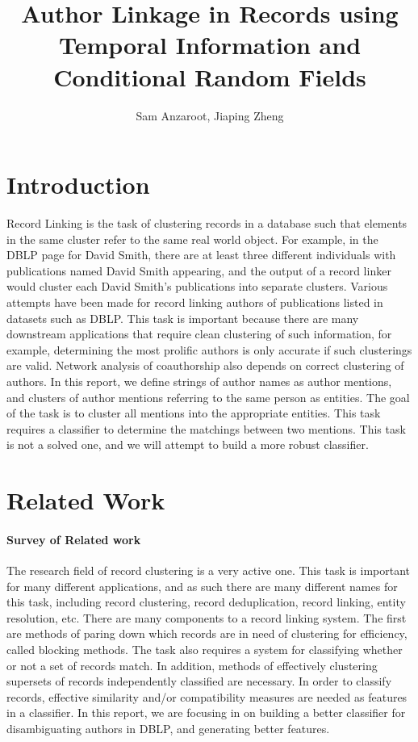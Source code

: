 \documentclass[twocolumn,letterpaper]{article}
\title{Author Linkage in Records using Temporal Information and Conditional Random Fields}
\author{Sam Anzaroot, Jiaping Zheng}
\date{}
\begin{document}
\ifpdf
{}
\else
{}
\fi

\maketitle

\section{Introduction} %
\label{sec:introduction}
Record Linking is the task of clustering records in a database such that elements in the same cluster refer to the same real world object. For example, in the DBLP page for David Smith, there are at least three different individuals with publications named David Smith appearing, and the output of a record linker would cluster each David Smith's publications into separate clusters. Various attempts have been made for record linking authors of publications listed in datasets such as DBLP. This task is important because there are many downstream applications that require clean clustering of such information, for example, determining the most prolific authors is only accurate if such clusterings are valid. Network analysis of coauthorship also depends on correct clustering of authors. In this report, we define strings of author names as author mentions, and clusters of author mentions referring to the same person as entities. The goal of the task is to cluster all mentions into the appropriate entities. This task requires a classifier to determine the matchings between two mentions. This task is not a solved one, and we will attempt to build a more robust classifier.

\section{Related Work} %
\label{sec:related_work}
\paragraph{Survey of Related work} %
\label{par:survey_of_related_work}
The research field of record clustering is a very active one. This task is important for many different applications, and as such there are many different names for this task, including record clustering, record deduplication, record linking, entity resolution, etc. There are many components to a record linking system. The first are methods of paring down which records are in need of clustering for efficiency, called blocking methods. The task also requires a system for classifying whether or not a set of records match. In addition, methods of effectively clustering supersets of records independently classified are necessary. In order to classify records, effective similarity and/or compatibility measures are needed as features in a classifier. In this report, we are focusing in on building a better classifier for disambiguating authors in DBLP, and generating better features.
\end{document}
